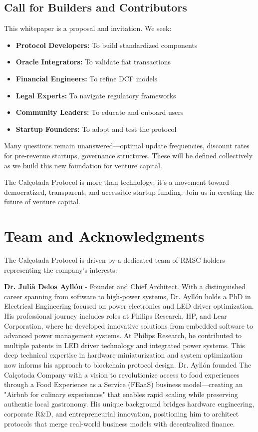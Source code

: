 \documentclass[conference]{IEEEtran}
\begin{document}
\subsection{Call for Builders and Contributors}

This whitepaper is a proposal and invitation. We seek:
\begin{itemize}
    \item \textbf{Protocol Developers:} To build standardized components
    \item \textbf{Oracle Integrators:} To validate fiat transactions
    \item \textbf{Financial Engineers:} To refine DCF models
    \item \textbf{Legal Experts:} To navigate regulatory frameworks
    \item \textbf{Community Leaders:} To educate and onboard users
    \item \textbf{Startup Founders:} To adopt and test the protocol
\end{itemize}

Many questions remain unanswered—optimal update frequencies, discount rates for pre-revenue startups, governance structures. These will be defined collectively as we build this new foundation for venture capital.

The Calçotada Protocol is more than technology; it's a movement toward democratized, transparent, and accessible startup funding. Join us in creating the future of venture capital.



\section{Team and Acknowledgments}

The Calçotada Protocol is driven by a dedicated team of RMSC holders representing the company's interests:

\textbf{Dr. Julià Delos Ayllón} - Founder and Chief Architect. With a distinguished career spanning from software to high-power systems, Dr. Ayllón holds a PhD in Electrical Engineering focused on power electronics and LED driver optimization. His professional journey includes roles at Philips Research, HP, and Lear Corporation, where he developed innovative solutions from embedded software to advanced power management systems. At Philips Research, he contributed to multiple patents in LED driver technology and integrated power systems. This deep technical expertise in hardware miniaturization and system optimization now informs his approach to blockchain protocol design. Dr. Ayllón founded The Calçotada Company with a vision to revolutionize access to food experiences through a Food Experience as a Service (FEaaS) business model—creating an "Airbnb for culinary experiences" that enables rapid scaling while preserving authentic local gastronomy. His unique background bridges hardware engineering, corporate R\&D, and entrepreneurial innovation, positioning him to architect protocols that merge real-world business models with decentralized finance.
\end{document}
